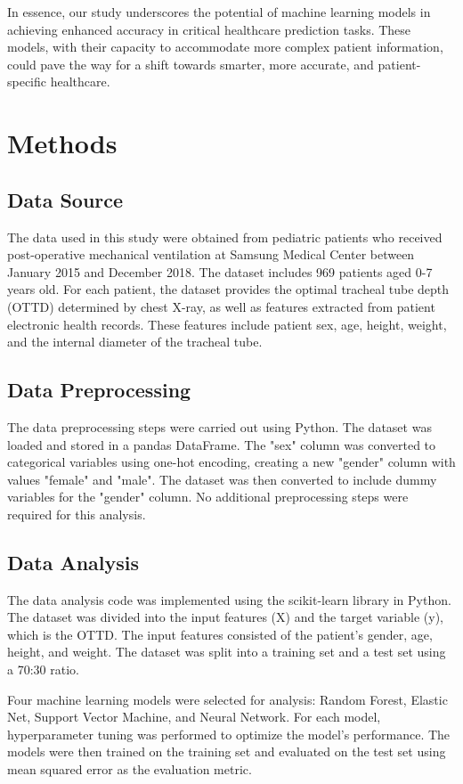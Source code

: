 \documentclass[11pt]{article}
\begin{document}
In essence, our study underscores the potential of machine learning models in achieving enhanced accuracy in critical healthcare prediction tasks. These models, with their capacity to accommodate more complex patient information, could pave the way for a shift towards smarter, more accurate, and patient-specific healthcare.

\section*{Methods}

\subsection*{Data Source}
The data used in this study were obtained from pediatric patients who received post-operative mechanical ventilation at Samsung Medical Center between January 2015 and December 2018. The dataset includes 969 patients aged 0-7 years old. For each patient, the dataset provides the optimal tracheal tube depth (OTTD) determined by chest X-ray, as well as features extracted from patient electronic health records. These features include patient sex, age, height, weight, and the internal diameter of the tracheal tube.

\subsection*{Data Preprocessing}
The data preprocessing steps were carried out using Python. The dataset was loaded and stored in a pandas DataFrame. The "sex" column was converted to categorical variables using one-hot encoding, creating a new "gender" column with values "female" and "male". The dataset was then converted to include dummy variables for the "gender" column. No additional preprocessing steps were required for this analysis.

\subsection*{Data Analysis}
The data analysis code was implemented using the scikit-learn library in Python. The dataset was divided into the input features (X) and the target variable (y), which is the OTTD. The input features consisted of the patient's gender, age, height, and weight. The dataset was split into a training set and a test set using a 70:30 ratio.

Four machine learning models were selected for analysis: Random Forest, Elastic Net, Support Vector Machine, and Neural Network. For each model, hyperparameter tuning was performed to optimize the model's performance. The models were then trained on the training set and evaluated on the test set using mean squared error as the evaluation metric.
\end{document}
